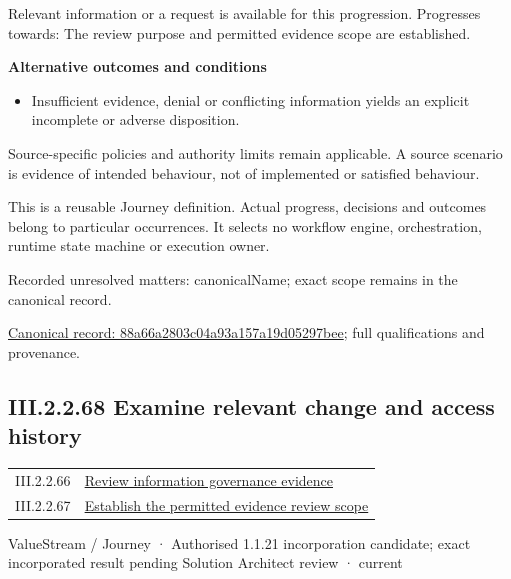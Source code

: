 Relevant information or a request is available for this progression. Progresses towards: The review purpose and permitted evidence scope are established.



\par\medskip\textbf{Alternative outcomes and conditions}\par


\begin{itemize}


\item Insufficient evidence, denial or conflicting information yields an explicit incomplete or adverse disposition.

\end{itemize}


Source-specific policies and authority limits remain applicable. A source scenario is evidence of intended behaviour, not of implemented or satisfied behaviour.



This is a reusable Journey definition. Actual progress, decisions and outcomes belong to particular occurrences. It selects no workflow engine, orchestration, runtime state machine or execution owner.


{\small Recorded unresolved matters: canonicalName; exact scope remains in the canonical record.}\par
{\footnotesize \href{../../../../../../../continuum/strategy/value-stream/88a66a2803c04a93a157a19d05297bee.md}{Canonical record: 88a66a2803c04a93a157a19d05297bee}; full qualifications and provenance.}\par
\subsection*{III.2.2.68 Examine relevant change and access history}
\label{navigation:III.2.2.68}

\begin{longtable}{p{.22\linewidth}p{.73\linewidth}}
III.2.2.66 & \hyperref[element:558e014abfce4750996f92473380284d]{Review information governance evidence} \\
III.2.2.67 & \hyperref[element:88a66a2803c04a93a157a19d05297bee]{Establish the permitted evidence review scope} \\
\end{longtable}
\label{element:39211c37cd3c4d3a8cdfe49d044c7f43}
{\small ValueStream / Journey · Authorised 1.1.21 incorporation candidate; exact incorporated result pending Solution Architect review · current}\par

